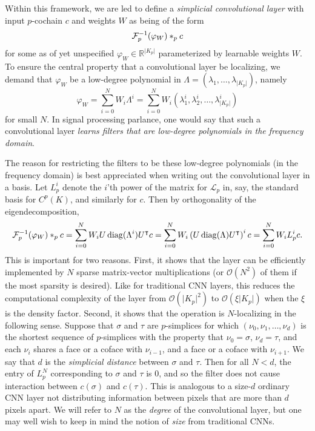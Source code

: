 Within this framework, we are led to define a \emph{simplicial convolutional layer} with input $p$-cochain $c$ and weights $W$ as being of the form
\begin{equation*}
  \mathcal{F}^{-1}_p(\varphi_W)\ast_p c  
\end{equation*}
for some as of yet unspecified $\varphi_W\in\mathbb{R}^{\lvert K_p \rvert}$ parameterized by learnable weights $W$. To ensure the central property that a convolutional layer be localizing, we demand that $\varphi_W$ be a low-degree polynomial in $\Lambda=(\lambda_1, \dotsc, \lambda_{\lvert K_p \rvert})$, namely
\begin{equation*}
  \varphi_W = \sum_{i=0}^N W_i\Lambda^i = \sum_{i=0}^N W_i(\lambda^i_1, \lambda^i_2, \dotsc, \lambda^i_{\lvert K_p \rvert})
\end{equation*}
for small $N$. In signal processing parlance, one would say that such a convolutional layer \emph{learns filters that are low-degree polynomials in the frequency domain}.

The reason for restricting the filters to be these low-degree polynomials (in the frequency domain) is best appreciated when writing out the convolutional layer in a basis. Let $L^i_p$ denote the $i$'th power of the matrix for $\mathcal{L}_p$ in, say, the standard basis for $C^p(K)$, and similarly for $c$. Then by orthogonality of the eigendecomposition,
\begin{equation}
  \mathcal{F}^{-1}_p(\varphi_W)\ast_p c = \sum_{i=0}^N W_iU\operatorname{diag}(\Lambda^i)U^{\intercal} c = \sum_{i=0}^N W_i\left(U\operatorname{diag}(\Lambda)U^{\intercal}\right)^i c = \sum_{i=0}^NW_iL^i_pc. \label{eq:filter}
\end{equation}
This is important for two reasons. First, it shows that the layer can be efficiently implemented by $N$ sparse matrix-vector multiplications (or $\mathcal{O}(N^2)$ of them if the most sparsity is desired). Like for traditional CNN layers, this reduces the computational complexity of the layer from $\mathcal{O}(\lvert K_p\rvert^2)$ to $\mathcal{O}(\xi\lvert K_p\rvert)$ when the $\xi$ is the density factor. Second, it shows that the operation is $N$-localizing in the following sense. Suppose that $\sigma$ and $\tau$ are $p$-simplices for which $(\nu_0, \nu_1, \dotsc, \nu_d)$ is the shortest sequence of $p$-simplices with the property that $\nu_0=\sigma$, $\nu_d=\tau$, and each $\nu_i$ shares a face or a coface with $\nu_{i-1}$, and a face or a coface with $\nu_{i+1}$. We say that $d$ is the \emph{simplicial distance} between $\sigma$ and $\tau$. Then for all $N<d$, the entry of $L_p^N$ corresponding to $\sigma$ and $\tau$ is $0$, and so the filter does not cause interaction between $c(\sigma)$ and $c(\tau)$. This is analogous to a size-$d$ ordinary CNN layer not distributing information between pixels that are more than $d$ pixels apart. We will refer to $N$ as the \emph{degree} of the convolutional layer, but one may well wish to keep in mind the notion of \emph{size} from traditional CNNs.

